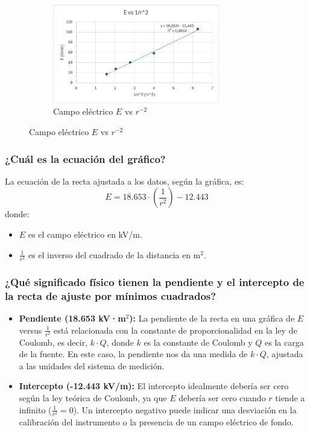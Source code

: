 \begin{figure}[H]
    \centering
    \begin{subfigure}[b]{\textwidth}
        \centering
        \includegraphics[width=0.8\textwidth]{Figures/1. Content/campoVSR2.png}
        \caption{Campo eléctrico $E$ vs $r^{-2}$}
        \label{fig: Campo vs r^-2}
    \end{subfigure}
    \hfill
\end{figure}

\subsubsection{¿Cuál es la ecuación del gráfico?}

La ecuación de la recta ajustada a los datos, según la gráfica, es:
\[
E = 18.653 \cdot \left(\frac{1}{r^2}\right) - 12.443
\]
donde:
\begin{itemize}
    \item \( E \) es el campo eléctrico en kV/m.
    \item \( \frac{1}{r^2} \) es el inverso del cuadrado de la distancia en m\(^2\).
\end{itemize}

\subsubsection{¿Qué significado físico tienen la pendiente y el intercepto de la recta de ajuste
por mínimos cuadrados?}
\begin{itemize}
    \item \textbf{Pendiente (18.653 kV·m\(^2\)):} La pendiente de la recta en una gráfica de \( E \) versus \( \frac{1}{r^2} \) está relacionada con la constante de proporcionalidad en la ley de Coulomb, es decir, \( k \cdot Q \), donde \( k \) es la constante de Coulomb y \( Q \) es la carga de la fuente. En este caso, la pendiente nos da una medida de \( k \cdot Q \), ajustada a las unidades del sistema de medición.
    \item \textbf{Intercepto (-12.443 kV/m):} El intercepto idealmente debería ser cero según la ley teórica de Coulomb, ya que \( E \) debería ser cero cuando \( r \) tiende a infinito (\(\frac{1}{r^2} = 0\)). Un intercepto negativo puede indicar una desviación en la calibración del instrumento o la presencia de un campo eléctrico de fondo.
\end{itemize}

